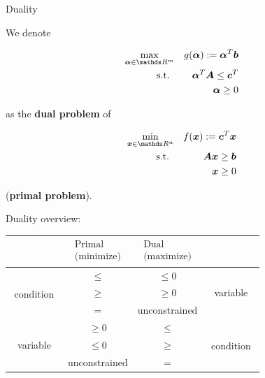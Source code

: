 \begin{vbframe}{Duality}

We denote

\vspace*{-0.2cm}
\begin{eqnarray*}
\max_{\bm{\alpha} \in \R^m} && g(\bm{\alpha}) := \bm{\alpha}^T\bm{b}\\
\text{s.t. } && \bm{\alpha}^T\bm{A} \le \bm{c}^T \\
&& \bm{\alpha} \ge 0
\end{eqnarray*}

as the \textbf{dual problem} of

\begin{eqnarray*}
\min_{\bm{x} \in \R^n} && f(\bm{x}) := \bm{c}^T\bm{x}\\
\text{s.t. } && \bm{A}\bm{x} \ge \bm{b} \\
&& \bm{x} \ge 0
\end{eqnarray*}

(\textbf{primal problem}).

\framebreak

Duality overview:

\begin{footnotesize}
\begin{center}
    \begin{tabular}{c | c | c | c}
    & $\begin{array}{c} \text{Primal} \\ \text{(minimize)} \end{array}$ & $\begin{array}{c} \text{Dual} \\ \text{(maximize)} \end{array}$ \\
    \hline
    \multirow{3}{*}{$\begin{array}{c} \text{condition} \end{array}$} & $\le$ & $\le 0$ & \multirow{3}{*}{variable} \\
  & $\ge$ & $\ge 0$ & \\
    & $=$ & unconstrained & \\
    \hline
    \multirow{3}{*}{variable} & $\ge 0 $ & $\le$ & \multirow{3}{*}{$\begin{array}{c} \text{condition} \end{array}$}\\
    & $\le 0$ &  $\ge$ & \\
    & unconstrained & $=$ & \\
\hline
    \end{tabular}
\end{center}
\end{footnotesize}
\end{vbframe}

